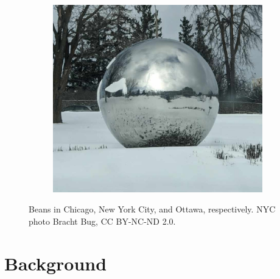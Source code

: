 \documentclass[%
reprint,
twocolumn,
nofootinbib,
 amsmath,amssymb,
 aps,
]{revtex4-2}
\begin{document}
\begin{figure}
\begin{subfigure}{0.15\textwidth}
    \end{subfigure}
    \begin{subfigure}{0.15\textwidth}
        \includegraphics[trim={2.5cm 4cm 2.5cm 3.5cm},clip,width=0.98\linewidth]{img/ottawa-sphere.jpg}
    \end{subfigure}
    \caption{Beans in Chicago, New York City, and Ottawa, respectively. NYC photo \textcopyright Bracht Bug, CC BY-NC-ND 2.0.}
    \label{fig:sculptures}
\end{figure}


\section{Background}
\label{section:background}


\end{document}
